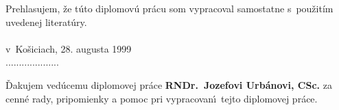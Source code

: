\begin{titlepage}
\parindent 0cm
\vspace*{8cm}  Prehlasujem, že túto diplomovú prácu
som vypracoval samostatne s~použitím uvedenej literatúry. \\
\\ v~Košiciach, 28. augusta 1999 \\

\hspace{9cm} ....................
\end{titlepage}
\begin{titlepage}
\parindent 0cm
\vspace*{8cm} Ďakujem vedúcemu diplomovej práce {\bf
RNDr.~Jozefovi Urbánovi, CSc.} za cenné rady, pripomienky a pomoc pri
vypracovan\'\i\ tejto diplomovej práce.
\end{titlepage}
\tableofcontents \newpage 
{}